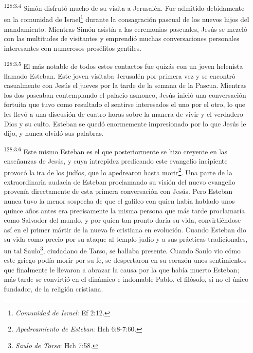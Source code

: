 \par 
\textsuperscript{128:3.4} Simón disfrutó mucho de su visita a Jerusalén. Fue admitido debidamente en la comunidad de Israel\footnote{\textit{Comunidad de Israel}: Ef 2:12.} durante la consagración pascual de los nuevos hijos del mandamiento. Mientras Simón asistía a las ceremonias pascuales, Jesús se mezcló con las multitudes de visitantes y emprendió muchas conversaciones personales interesantes con numerosos prosélitos gentiles.

\par 
\textsuperscript{128:3.5} El más notable de todos estos contactos fue quizás con un joven helenista llamado Esteban. Este joven visitaba Jerusalén por primera vez y se encontró casualmente con Jesús el jueves por la tarde de la semana de la Pascua. Mientras los dos paseaban contemplando el palacio asmoneo, Jesús inició una conversación fortuita que tuvo como resultado el sentirse interesados el uno por el otro, lo que les llevó a una discusión de cuatro horas sobre la manera de vivir y el verdadero Dios y su culto. Esteban se quedó enormemente impresionado por lo que Jesús le dijo, y nunca olvidó sus palabras.

\par 
\textsuperscript{128:3.6} Este mismo Esteban es el que posteriormente se hizo creyente en las enseñanzas de Jesús, y cuya intrepidez predicando este evangelio incipiente provocó la ira de los judíos, que lo apedrearon hasta morir\footnote{\textit{Apedreamiento de Esteban}: Hch 6:8-7:60.}. Una parte de la extraordinaria audacia de Esteban proclamando su visión del nuevo evangelio provenía directamente de esta primera conversación con Jesús. Pero Esteban nunca tuvo la menor sospecha de que el galileo con quien había hablado unos quince años antes era precisamente la misma persona que más tarde proclamaría como Salvador del mundo, y por quien tan pronto daría su vida, convirtiéndose así en el primer mártir de la nueva fe cristiana en evolución. Cuando Esteban dio su vida como precio por su ataque al templo judío y a sus prácticas tradicionales, un tal Saulo\footnote{\textit{Saulo de Tarso}: Hch 7:58.}, ciudadano de Tarso, se hallaba presente. Cuando Saulo vio cómo este griego podía morir por su fe, se despertaron en su corazón unos sentimientos que finalmente le llevaron a abrazar la causa por la que había muerto Esteban; más tarde se convirtió en el dinámico e indomable Pablo, el filósofo, si no el único fundador, de la religión cristiana.

